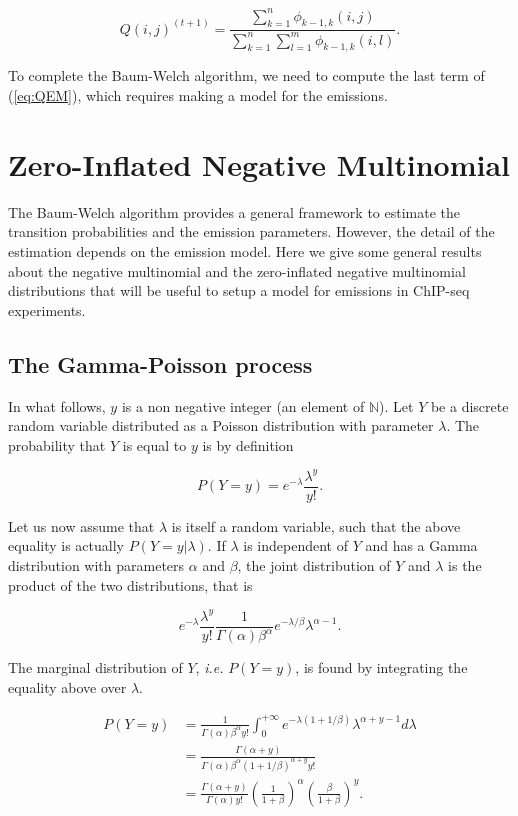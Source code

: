 \documentclass[12pt]{article}
\begin{document}
\begin{appendices}
    $$ Q(i,j)^{(t+1)} = \frac{\sum_{k=1}^n \phi_{k-1,k}(i,j)}
      {\sum_{k=1}^n\sum_{l=1}^m\phi_{k-1,k}(i,l)}. $$

    To complete the Baum-Welch algorithm, we need to compute the last
    term of (\ref{eq:QEM}), which requires making a model for the
    emissions.

\section{Zero-Inflated Negative Multinomial}
\label{sec:nb}

The Baum-Welch algorithm provides a general framework to estimate
the transition probabilities and the emission parameters. However,
the detail of the estimation depends on the emission model. Here
we give some general results about the negative multinomial and
the zero-inflated negative multinomial distributions that will
be useful to setup a model for emissions in ChIP-seq experiments.

\subsection{The Gamma-Poisson process}
\label{sec:gamma_poisson}

    In what follows, $y$ is a non negative integer (an element of
    $\mathbb{N}$). Let $Y$ be a discrete random variable distributed
    as a Poisson distribution with parameter $\lambda$. The
    probability that $Y$ is equal to $y$ is by definition

    \begin{equation}
\label{eq:poisson}
      P(Y=y) = e^{-\lambda} \frac{\lambda^y}{y!}.
    \end{equation}

    Let us now assume that $\lambda$ is itself a random variable,
    such that the above equality is actually $P(Y=y | \lambda)$.
    If $\lambda$ is independent of $Y$ and has a Gamma distribution
    with parameters $\alpha$ and $\beta$, the joint distribution of
    $Y$ and $\lambda$ is the product of the two distributions, that
    is

    $$ e^{-\lambda} \frac{\lambda^y}{y!}
         \frac{1}{\Gamma(\alpha)\beta^{\alpha}} e^{-\lambda/\beta}
         \lambda^{\alpha-1}. $$

    The marginal distribution of $Y$, \textit{i.e.} $P(Y=y)$, is found
    by integrating the equality above over $\lambda$.

    \begin{align}
\label{eq:nb_distrib}
      P(Y=y) &= \frac{1}{\Gamma(\alpha)\beta^{\alpha}y!}
         \int_0^{+\infty} e^{-\lambda(1+1/\beta)} \lambda^{\alpha+y-1}
         d\lambda \nonumber \\
        &= \frac{\Gamma(\alpha+y)}{\Gamma(\alpha)\beta^{\alpha}
          (1+1/\beta)^{\alpha+y} y!} \nonumber \\
        &= \frac{\Gamma(\alpha+y)}{\Gamma(\alpha)y!}
          \left(\frac{1}{1+\beta}\right)^{\alpha}
          \left(\frac{\beta}{1+\beta}\right)^y.
    \end{align}


\end{appendices}
\end{document}
